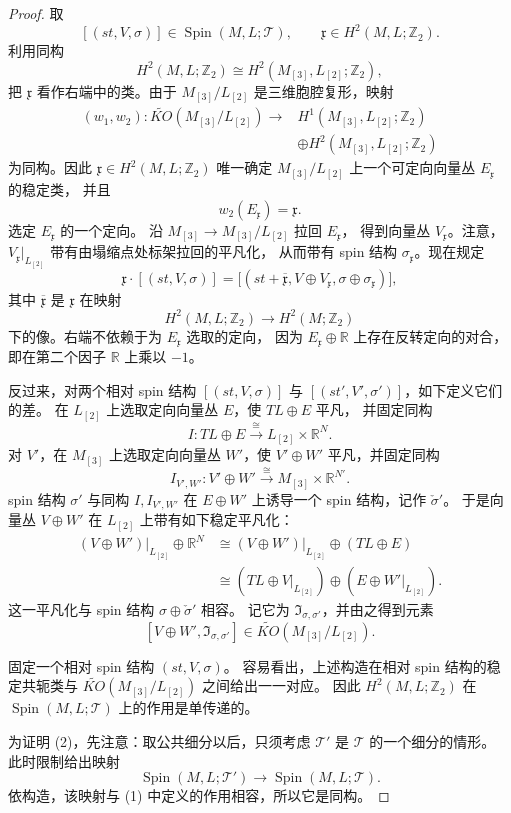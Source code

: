 \begin{proof}
取
\[
[(st,V,\sigma)]\in\operatorname{Spin}(M,L;\mathcal T),
\qquad
\mathfrak x\in H^2(M,L;\mathbb Z_2).
\]
利用同构
\[
H^2(M,L;\mathbb Z_2)
\cong H^2(M_{[3]},L_{[2]};\mathbb Z_2),
\]
把 $\mathfrak x$ 看作右端中的类。由于
$M_{[3]}/L_{[2]}$ 是三维胞腔复形，映射
\[
\begin{split}
(w_1,w_2)\colon
\widetilde{KO}(M_{[3]}/L_{[2]})
\longrightarrow{}&H^1(M_{[3]},L_{[2]};\mathbb Z_2)\\
&\oplus H^2(M_{[3]},L_{[2]};\mathbb Z_2)
\end{split}
\]
为同构。因此 $\mathfrak x\in H^2(M,L;\mathbb Z_2)$ 唯一确定
$M_{[3]}/L_{[2]}$ 上一个可定向向量丛 $E_{\mathfrak x}$ 的稳定类，
并且
\[
w_2(E_{\mathfrak x})=\mathfrak x.
\]
选定 $E_{\mathfrak x}$ 的一个定向。
沿 $M_{[3]}\to M_{[3]}/L_{[2]}$ 拉回 $E_{\mathfrak x}$，
得到向量丛 $V_{\mathfrak x}$。注意，
$V_{\mathfrak x}|_{L_{[2]}}$ 带有由塌缩点处标架拉回的平凡化，
从而带有 spin 结构 $\sigma_{\mathfrak x}$。现在规定
\[
\mathfrak x\cdot[(st,V,\sigma)]
=\bigl[(st+\overline{\mathfrak x},
 V\oplus V_{\mathfrak x},
 \sigma\oplus\sigma_{\mathfrak x})\bigr],
\]
其中 $\overline{\mathfrak x}$ 是 $\mathfrak x$ 在映射
\[
H^2(M,L;\mathbb Z_2)\longrightarrow H^2(M;\mathbb Z_2)
\]
下的像。右端不依赖于为 $E_{\mathfrak x}$ 选取的定向，
因为 $E_{\mathfrak x}\oplus\mathbb R$ 上存在反转定向的对合，
即在第二个因子 $\mathbb R$ 上乘以 $-1$。

反过来，对两个相对 spin 结构
$[(st,V,\sigma)]$ 与 $[(st',V',\sigma')]$，如下定义它们的差。
在 $L_{[2]}$ 上选取定向向量丛 $E$，使 $TL\oplus E$ 平凡，
并固定同构
\[
I\colon TL\oplus E\xrightarrow{\cong}L_{[2]}\times\mathbb R^N.
\]
对 $V'$，在 $M_{[3]}$ 上选取定向向量丛 $W'$，使
$V'\oplus W'$ 平凡，并固定同构
\[
I_{V',W'}\colon V'\oplus W'\xrightarrow{\cong}
M_{[3]}\times\mathbb R^{N'}.
\]
spin 结构 $\sigma'$ 与同构 $I,I_{V',W'}$ 在
$E\oplus W'$ 上诱导一个 spin 结构，记作 $\check\sigma'$。
于是向量丛 $V\oplus W'$ 在 $L_{[2]}$ 上带有如下稳定平凡化：
\[
\begin{split}
(V\oplus W')|_{L_{[2]}}\oplus\mathbb R^N
&\cong (V\oplus W')|_{L_{[2]}}\oplus(TL\oplus E)\\
&\cong (TL\oplus V|_{L_{[2]}})
 \oplus(E\oplus W'|_{L_{[2]}}).
\end{split}
\]
这一平凡化与 spin 结构 $\sigma\oplus\check\sigma'$ 相容。
记它为 $\mathfrak I_{\sigma,\sigma'}$，并由之得到元素
\[
[V\oplus W',\mathfrak I_{\sigma,\sigma'}]
\in\widetilde{KO}(M_{[3]}/L_{[2]}).
\]

固定一个相对 spin 结构 $(st,V,\sigma)$。
容易看出，上述构造在相对 spin 结构的稳定共轭类与
$\widetilde{KO}(M_{[3]}/L_{[2]})$ 之间给出一一对应。
因此 $H^2(M,L;\mathbb Z_2)$ 在
$\operatorname{Spin}(M,L;\mathcal T)$ 上的作用是单传递的。

为证明 (2)，先注意：取公共细分以后，只须考虑
$\mathcal T'$ 是 $\mathcal T$ 的一个细分的情形。
此时限制给出映射
\[
\operatorname{Spin}(M,L;\mathcal T')
\longrightarrow\operatorname{Spin}(M,L;\mathcal T).
\]
依构造，该映射与 (1) 中定义的作用相容，所以它是同构。
\end{proof}

